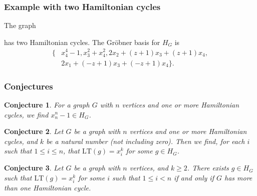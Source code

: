 \documentclass{beamer}
\newtheorem{conjecture}{Conjecture}
\begin{document}
\begin{frame}
\frametitle{Example with two Hamiltonian cycles}
The graph
\begin{center}
\end{center}
has two Hamiltonian cycles. The Gr\"obner basis for $H_G$ is
\begin{align*}
	\{& x_4^4-1, x_3^2+x_4^2, 2x_2+(z+1)x_3+(z+1)x_4,\\& 2x_1+(-z+1)x_3+(-z+1)x_4\}.
\end{align*}
\end{frame}

\begin{frame}
\frametitle{Conjectures}
\begin{conjecture}
	For a graph $G$ with $n$ vertices and one or more Hamiltonian cycles, we find $x_n^n - 1 \in H_G$.
\end{conjecture}
\begin{conjecture}
	Let $G$ be a graph with $n$ vertices and one or more Hamiltonian cycles, and $k$ be a natural number (not including zero). Then we find, for each $i$ such that $1 \leq i \leq n$, that $\mathrm{LT}(g) = x_i^k$ for some $g \in H_G$.
\end{conjecture}
\begin{conjecture}
	Let $G$ be a graph with $n$ vertices, and $k \geq 2$. There exists $g \in H_G$ such that $\mathrm{LT}(g) = x_i^k$ for some $i$ such that $1 \leq i < n$ if and only if $G$ has more than one Hamiltonian cycle.
\end{conjecture}
\end{frame}
\end{document}
